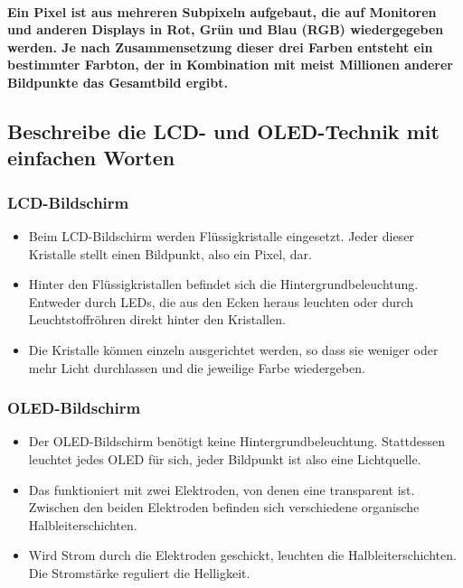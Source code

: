 \documentclass[a4paper]{article}
\begin{document}
    \paragraph{\color{codegreen} Ein Pixel ist aus mehreren Subpixeln aufgebaut, die auf Monitoren und anderen Displays in Rot, Grün und Blau (RGB) wiedergegeben werden. Je nach Zusammensetzung dieser drei Farben entsteht ein bestimmter Farbton, der in Kombination mit meist Millionen anderer Bildpunkte das Gesamtbild ergibt.}

    \subsection{\color{red}Beschreibe die LCD- und OLED-Technik mit einfachen Worten}\label{subsec:beschreibe-die-lcd--und-oled-technik-mit-einfachen-worten}
    \begin{multicols}{2}
        \subsubsection{\color{codegreen}LCD-Bildschirm}
        \begin{itemize}
            \color{magenta}
            \item Beim LCD-Bildschirm werden Flüssigkristalle eingesetzt.
            Jeder dieser Kristalle stellt einen Bildpunkt, also ein Pixel, dar.
            \item Hinter den Flüssigkristallen befindet sich die Hintergrundbeleuchtung.
            Entweder durch LEDs, die aus den Ecken heraus leuchten oder durch Leuchtstoffröhren direkt hinter den Kristallen.
            \item Die Kristalle können einzeln ausgerichtet werden, so dass sie weniger oder mehr Licht durchlassen und die jeweilige Farbe wiedergeben.
        \end{itemize}

        \subsubsection{\color{codegreen}OLED-Bildschirm}
        \begin{itemize}
            \color{magenta}
            \item Der OLED-Bildschirm benötigt keine Hintergrundbeleuchtung.
            Stattdessen leuchtet jedes OLED für sich, jeder Bildpunkt ist also eine Lichtquelle.
            \item Das funktioniert mit zwei Elektroden, von denen eine transparent ist.
            Zwischen den beiden Elektroden befinden sich verschiedene organische Halbleiterschichten.
            \item Wird Strom durch die Elektroden geschickt, leuchten die Halbleiterschichten.
            Die Stromstärke reguliert die Helligkeit.
        \end{itemize}
    \end{multicols}
\end{document}
